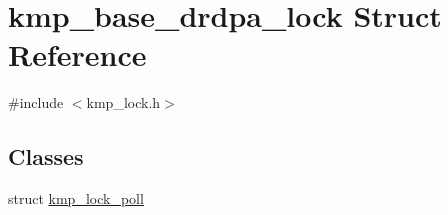 \hypertarget{structkmp__base__drdpa__lock}{\section{kmp\-\_\-base\-\_\-drdpa\-\_\-lock Struct Reference}
\label{structkmp__base__drdpa__lock}
}


{\ttfamily \#include $<$kmp\-\_\-lock.\-h$>$}

\subsection*{Classes}
\begin{DoxyCompactItemize}
\item 
struct \hyperlink{structkmp__base__drdpa__lock_1_1kmp__lock__poll}{kmp\-\_\-lock\-\_\-poll}
\end{DoxyCompactItemize}
